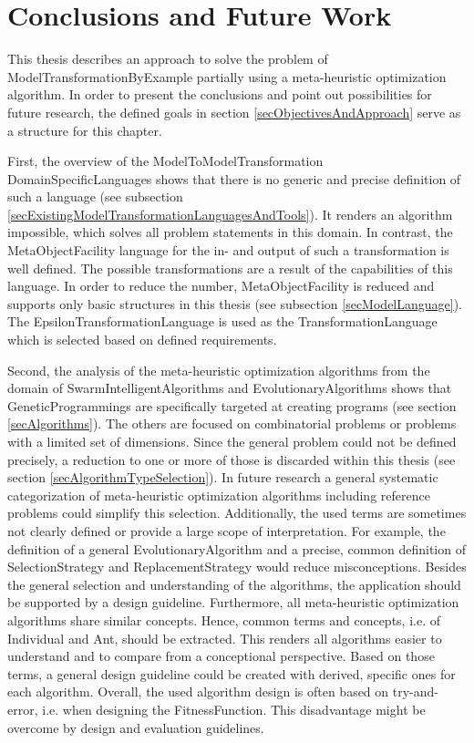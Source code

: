 \chapter{Conclusions and Future Work}\label{secConclusions}

This thesis describes an approach to solve the problem of \gls{ModelTransformationByExample} partially using a meta-heuristic optimization algorithm. In order to present the conclusions and point out possibilities for future research, the defined goals in section \ref{secObjectivesAndApproach} serve as a structure for this chapter.

First, the overview of the \gls{ModelToModelTransformation} \glspl{DomainSpecificLanguage} shows that there is no generic and precise definition of such a language (see subsection \ref{secExistingModelTransformationLanguagesAndTools}). It renders an algorithm impossible, which solves all problem statements in this domain. In contrast, the \gls{MetaObjectFacility} language for the in- and output of such a transformation is well defined. The possible transformations are a result of the capabilities of this language. In order to reduce the number, \gls{MetaObjectFacility} is reduced and supports only basic structures in this thesis (see subsection \ref{secModelLanguage}). The \gls{EpsilonTransformationLanguage} is used as the \gls{TransformationLanguage} which is selected based on defined requirements.

Second, the analysis of the meta-heuristic optimization algorithms from the domain of \glspl{SwarmIntelligentAlgorithm} and \glspl{EvolutionaryAlgorithm} shows that \glspl{GeneticProgramming} are specifically targeted at creating programs (see section \ref{secAlgorithms}). The others are focused on combinatorial problems or problems with a limited set of dimensions. Since the general problem could not be defined precisely, a reduction to one or more of those is discarded within this thesis (see section \ref{secAlgorithmTypeSelection}). In future research a general systematic categorization of meta-heuristic optimization algorithms including reference problems could simplify this selection. Additionally, the used terms are sometimes not clearly defined or provide a large scope of interpretation. For example, the definition of a general \gls{EvolutionaryAlgorithm} and a precise, common definition of \gls{SelectionStrategy} and \gls{ReplacementStrategy} would reduce misconceptions. Besides the general selection and understanding of the algorithms, the application should be supported by a design guideline. Furthermore, all meta-heuristic optimization algorithms share similar concepts. Hence, common terms and concepts, i.e. of \gls{Individual} and \gls{Ant}, should be extracted. This renders all algorithms easier to understand and to compare from a conceptional perspective. Based on those terms, a general design guideline could be created with derived, specific ones for each algorithm. Overall, the used algorithm design is often based on try-and-error, i.e. when designing the \gls{FitnessFunction}. This disadvantage might be overcome by design and evaluation guidelines.


